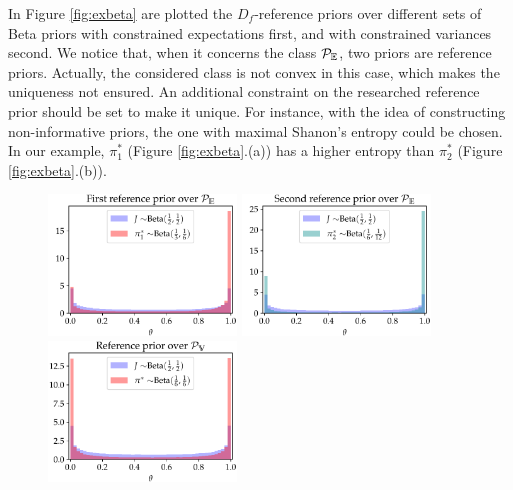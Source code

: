 In Figure \ref{fig:exbeta} are plotted the $D_f$-reference priors over different sets of Beta priors with constrained expectations first, and with constrained variances second. We notice that, when it concerns the class $\mathcal{P}_{\mathbb{E}}$, two priors are reference priors. Actually, the considered class is not convex in this case, which makes the uniqueness not ensured. An additional constraint on the researched reference prior should be set to make it unique. For instance, with the idea of constructing non-informative priors, the one with maximal Shanon's entropy could be chosen. In our example, $\pi_1^\ast$ (Figure \ref{fig:exbeta}.(a)) has a higher entropy than $\pi_2^\ast$ (Figure \ref{fig:exbeta}.(b)).



\begin{figure}
    \centering%
    \includegraphics[width=5cm]{figures/generalized-ref/firstPe.pdf}\hspace*{0.5cm}%
    \includegraphics[width=5cm]{figures/generalized-ref/secondPe.pdf}\hspace*{0.5cm}%
    \includegraphics[width=5cm]{figures/generalized-ref/Pv.pdf}\\
\end{figure}
